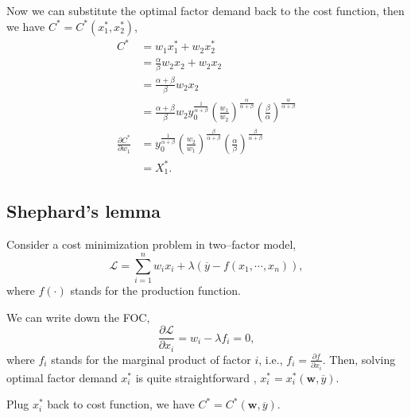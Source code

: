 \documentclass[12pt]{article}
\begin{document}
Now we can substitute the optimal factor demand back to the cost function,
then we have $ C^{*} = C^{*}(x_1^{*}, x_2^{*}) $,
\begin{align}
				C^{*} &= w_1x_1^{*} + w_2x_2^{*}\\
				 &= \frac{\alpha}{\beta }w_2x_2 + w_2x_2\\
				 &= \frac{\alpha  + \beta }{\beta }w_2x_2\\
				 &= \frac{\alpha  + \beta }{\beta }w_2y_0^{\frac{1}{\alpha  + \beta }}
				(\frac{w_1}{w_2})^{\frac{\alpha}{\alpha  + \beta }}
				(\frac{\beta}{\alpha })^{\frac{\alpha}{\alpha  + \beta }}\\
				\frac{\partial C^{*} }{\partial w_1 }
				 &= y_0^{\frac{1}{\alpha  + \beta }}(\frac{w_2}{w_1})^{\frac{\beta}{
				 \alpha  + \beta }}(\frac{\alpha}{\beta })^{\frac{\beta}{
				 \alpha  + \beta }}\\
				 &= X_1^{*}.
\end{align}






\subsection{Shephard's lemma}


Consider a cost minimization problem in two--factor model,
\begin{equation}
				\mathscr{L} = \sum\limits_{i = 1} ^n w_{i}x_{i} + \lambda 
				(\overline{y} - f(x_1, \cdots, x_{n})),
\end{equation}
where $ f(\cdot ) $ stands for the production function.

We can write down the FOC,
\begin{equation}
				\frac{\partial \mathscr{L} }{\partial x_{i} } = w_{i} - \lambda f_{i}=0,
\end{equation}
where $ f_{i} $ stands for the marginal product of factor $ i $, i.e., 
$ f_{i} = \frac{\partial f }{\partial x_{i} } $.
Then, solving optimal factor demand $ x_{i}^{*} $ is quite straightforward
, $ x_{i}^{*} = x_{i}^{*}(\bm{w},\overline{y}) $.

Plug $ x_{i}^{*} $ back to cost function, we have $ C^{*} = C^{*}(\bm{w},
\overline{y}) $.
\end{document}
